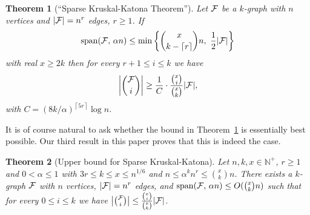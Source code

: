 \documentclass[11pt]{article}
\newtheorem{theo}{Theorem}[section]
\newtheorem{theo}{Theorem}[section]
\newcommand{\FF}{{\cal F}}
\newcommand{\ceil}[1]{\left\lceil #1 \right\rceil}
\renewcommand{\wp}{\mathrm{span}}
\renewcommand{\a}{\alpha}
\newcommand{\sub}{\subseteq}
\newcommand{\N}{\mathbb{N}}
\begin{document}
%
%


\begin{theo}[``Sparse Kruskal-Katona Theorem'']\label{th:skk-intro}
	Let $\FF$ be a $k$-graph with $n$ vertices and $|\FF|=n^r$ edges, $r \ge 1$. 
	If 
	$$\wp(\FF,\,\a n) \le \min\bigg\{\binom{x}{k-\ceil{r}}n, \,\, \frac{1}{2}|\FF|\bigg\}$$
	with real $x \ge 2k$ then for every $r+1 \le i \le k$ we have 
	$$\bigg|\binom{\FF}{i}\bigg| \ge \frac{1}{C}\cdot \frac{\binom{x}{i}}{\binom{x}{k}}|\FF|,$$
	with $C = (8k/\a)^{\ceil{5r}}\log n$.
\end{theo}


It is of course natural to ask whether the bound in Theorem~\ref{th:skk-intro} is essentially best possible.
Our third result in this paper proves that this is indeed the case.

\begin{theo}[Upper bound for Sparse Kruskal-Katona]\label{theo:sKK-UB-intro}
	Let $n,k,x \in \N^+$, $r \ge 1$ and $0 < \a \le 1$ with 
	$3r \le k \le x \le n^{1/6}$
	and $n \le \a^k n^r \le \binom{x}{k}n$.
	There exists a $k$-graph $\FF$ with $n$ vertices, $|\FF|=n^r$ edges, 
	and 
	$\wp(\FF,\,\a n) \le O(\binom{x}{k}n)$
	such that for every $0 \le i \le k$ we have 
	$\big|\binom{\FF}{i}\big| \le \frac{\binom{x}{i}}{\binom{x}{k}}|\FF|$.
\end{theo} 
\end{document}
